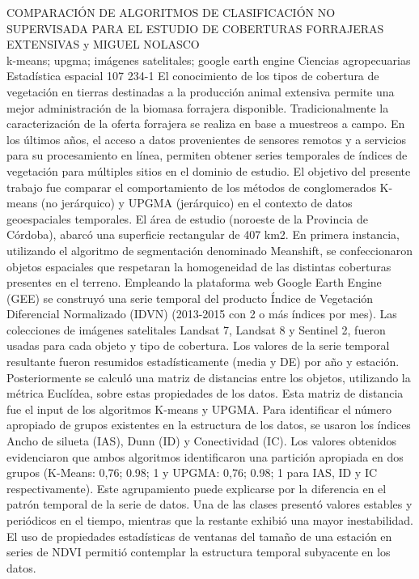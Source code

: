 \A
{COMPARACIÓN DE ALGORITMOS DE CLASIFICACIÓN NO SUPERVISADA PARA EL ESTUDIO DE COBERTURAS FORRAJERAS EXTENSIVAS}
{ y MIGUEL NOLASCO}
{
\\}
{k-means; upgma; imágenes satelitales; google earth engine} 
 {Ciencias agropecuarias} 
 {Estadística espacial} 
 {107} 
 {234-1}
{El conocimiento de los tipos de cobertura de vegetación en tierras destinadas a la producción animal extensiva permite una mejor administración de la biomasa forrajera disponible. Tradicionalmente la caracterización de la oferta forrajera se realiza en base a muestreos a campo. En los últimos años, el acceso a datos provenientes de sensores remotos y a servicios para su procesamiento en línea, permiten obtener series temporales de índices de vegetación para múltiples sitios en el dominio de estudio. El objetivo del presente trabajo fue comparar el comportamiento de los métodos de conglomerados K-means (no jerárquico) y UPGMA (jerárquico) en el contexto de datos geoespaciales temporales. El área de estudio (noroeste de la Provincia de Córdoba), abarcó una superficie rectangular de 407 km2. En primera instancia, utilizando el algoritmo de segmentación denominado Meanshift, se confeccionaron objetos espaciales que respetaran la homogeneidad de las distintas coberturas presentes en el terreno. Empleando la plataforma web Google Earth Engine (GEE) se construyó una serie temporal del producto Índice de Vegetación Diferencial Normalizado (IDVN) (2013-2015 con 2 o más índices por mes). Las colecciones de imágenes satelitales Landsat 7, Landsat 8 y Sentinel 2, fueron usadas para cada objeto y tipo de cobertura. Los valores de la serie temporal resultante fueron resumidos estadísticamente (media y DE) por año y estación. Posteriormente se calculó una matriz de distancias entre los objetos, utilizando la métrica Euclídea, sobre estas propiedades de los datos. Esta matriz de distancia fue el input de los algoritmos K-means y UPGMA. Para identificar el número apropiado de grupos existentes en la estructura de los datos, se usaron los índices Ancho de silueta (IAS), Dunn (ID) y Conectividad (IC). Los valores obtenidos evidenciaron que ambos algoritmos identificaron una partición apropiada en dos grupos (K-Means: 0,76; 0.98; 1 y UPGMA: 0,76; 0.98; 1 para IAS, ID y IC respectivamente). Este agrupamiento puede explicarse por la diferencia en el patrón temporal de la serie de datos. Una de las clases presentó valores estables y periódicos en el tiempo, mientras que la restante exhibió una mayor inestabilidad. El uso de propiedades estadísticas de ventanas del tamaño de una estación en series de NDVI permitió contemplar la estructura temporal subyacente en los datos.}
